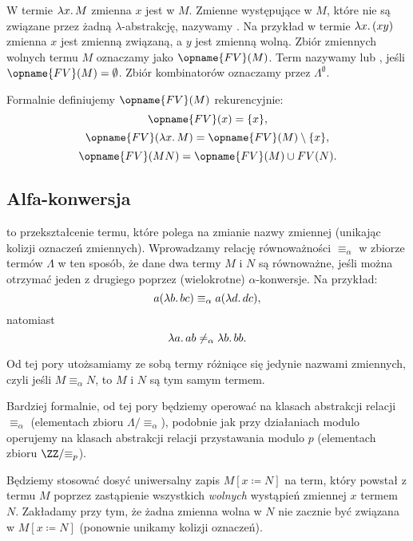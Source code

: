 \documentclass[polish,pretty]{angav}
\newcommand{\FV}{\opname{FV}}
\begin{document}
W termie $\lambda x\ldotp M$ zmienna $x$ jest  w $M$.
Zmienne występujące w $M$, które nie są związane przez żadną $\lambda$-abstrakcję, nazywamy .
Na przykład w termie $\lambda x\ldotp (x y)$ zmienna $x$ jest zmienną związaną, a $y$ jest zmienną wolną.
Zbiór zmiennych wolnych termu $M$ oznaczamy jako $\FV(M)$.
Term nazywamy  lub , jeśli $\FV(M) = \emptyset$.
Zbiór kombinatorów oznaczamy przez $\Lambda^\emptyset$.

\begin{remark}
    Formalnie definiujemy $\FV(M)$ rekurencyjnie:
    \[ \FV(x) = \{x\}, \]
    \[ \FV(\lambda x\ldotp M) = \FV(M) \setminus \{x\}, \]
    \[ \FV(MN) = \FV(M) \cup FV(N). \]
\end{remark}

\subsection{Alfa-konwersja}

 to przekształcenie termu, które polega na zmianie nazwy zmiennej (unikając kolizji oznaczeń zmiennych). Wprowadzamy relację równoważności $\equiv_\alpha$ w zbiorze termów $\Lambda$ w ten sposób, że dane dwa termy $M$ i $N$ są równoważne, jeśli można otrzymać jeden z drugiego poprzez (wielokrotne) $\alpha$-konwersje. Na przykład:
\[ a (\lambda b\ldotp bc) \equiv_\alpha a (\lambda d\ldotp dc), \]
natomiast
\[ \lambda a\ldotp ab \neq_\alpha \lambda b\ldotp bb. \]

Od tej pory utożsamiamy ze sobą termy różniące się jedynie nazwami zmiennych, czyli jeśli $M \equiv_\alpha N$, to $M$ i $N$ są tym samym termem.

\begin{remark}
    Bardziej formalnie, od tej pory będziemy operować na klasach abstrakcji relacji $\equiv_\alpha$ (elementach zbioru $\Lambda/{\equiv_\alpha}$), podobnie jak przy działaniach modulo operujemy na klasach abstrakcji relacji przystawania modulo $p$ (elementach zbioru $\ZZ/{\equiv_p}$).
\end{remark}

Będziemy stosować dosyć uniwersalny zapis $M[x \coloneqq N]$ na term, który powstał z termu $M$ poprzez zastąpienie wszystkich \emph{wolnych} wystąpień zmiennej $x$ termem $N$.
Zakładamy przy tym, że żadna zmienna wolna w $N$ nie zacznie być związana w $M[x \coloneqq N]$ (ponownie unikamy kolizji oznaczeń).
\end{document}
